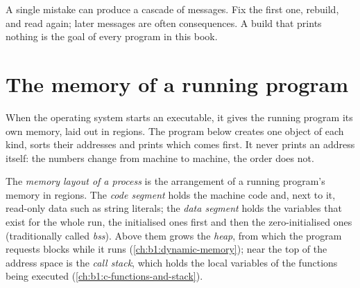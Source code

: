 \begin{inpractice}
A single mistake can produce a cascade of messages. Fix the first one, rebuild, and read again; later messages
are often consequences. A build that prints nothing is the goal of every program in this book.
\end{inpractice}

\section{The memory of a running program}\label{sec:b1:compilation-pipeline:memory}

When the operating system starts an executable, it gives the running program its own memory, laid out in
regions. The program below creates one object of each kind, sorts their addresses and prints which comes first.
It never prints an address itself: the numbers change from machine to machine, the order does not.

\label{lst:b1:compilation-pipeline:regions}

\label{out:b1:compilation-pipeline:regions}

\begin{definition}\label{def:b1:compilation-pipeline:layout}
The \emph{memory layout of a process} is the arrangement of a running
program's memory in regions. The \emph{code segment} holds the machine code and, next to it,
read-only data such as string literals; the \emph{data segment} holds the variables that
exist for the whole run, the initialised ones first and then the zero-initialised ones (traditionally called
\emph{bss}). Above them grows the \emph{heap}, from which the program requests blocks while it runs
(\cref{ch:b1:dynamic-memory}); near the top of the address space is the \emph{call stack}, which holds the
local variables of the functions being executed (\cref{ch:b1:c-functions-and-stack}).
\end{definition}

